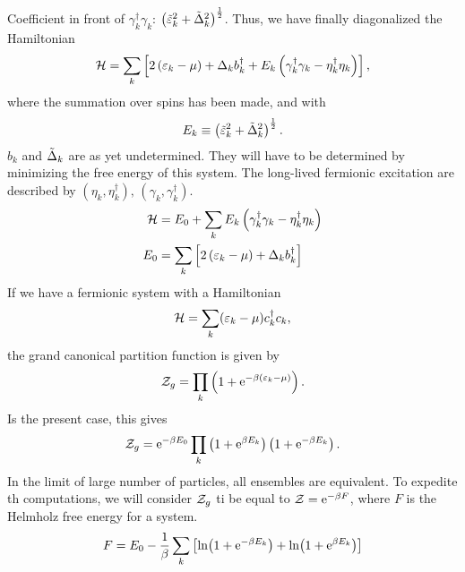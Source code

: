 Coefficient in front of $\gamma_k^\dagger\gamma_k$: $\left(\tilde{\varepsilon}_k^2 + \tilde{\Delta}_k^2\right)^\frac12$. Thus, we have finally diagonalized the Hamiltonian 
\begin{equation}
\mathcal{H} = \sum_k\left[2\left(\varepsilon_k-\mu\right) + \Delta_kb_k^\dagger + E_k\left(\gamma_k^\dagger\gamma_k - \eta_k^\dagger\eta_k\right)\right],
\end{equation}
where the summation over spins has been made, and with
\begin{equation}
E_k\equiv \left(\tilde{\varepsilon}_k^2 + \tilde{\Delta}_k^2\right)^\frac12.
\end{equation}
$b_k$ and $\tilde{\Delta}_k$ are as yet undetermined. They will have to be determined by minimizing the free energy of this system. 
The long-lived fermionic excitation are described by $(\eta_k, \eta_k^\dagger),\,(\gamma_k, \gamma_k^\dagger)$.
\begin{align}
\mathcal{H} &= E_0 + \sum_k E_k\left(\gamma_k^\dagger\gamma_k - \eta_k^\dagger\eta_k \right) \\
E_0 &= \sum_k \left[2\left(\varepsilon_k-\mu\right) + \Delta_kb_k^\dagger\right]
\end{align}
If we have a fermionic system with a Hamiltonian \[\mathcal{H} = \sum_k(\varepsilon_k-\mu)c^\dagger_kc_k,\] the grand canonical partition function is given by
\begin{equation}
\mathcal{Z}_g = \prod_k\left(1+\mathrm{e}^{-\beta(\varepsilon_k-\mu)}\right).
\end{equation}
Is the present case, this gives 
\begin{equation}
\mathcal{Z}_g =\mathrm{e}^{-\beta E_0}\prod_k\left(1+\mathrm{e}^{\beta E_k}\right)\left(1+\mathrm{e}^{-\beta E_k}\right).
\end{equation}
In the limit of large number of particles, all ensembles are equivalent. To expedite th computations, we will consider $\mathcal{Z}_g$ ti be equal to $\mathcal{Z} = \mathrm{e}^{-\beta F}$, where $F$ is the Helmholz free energy for a system.
\begin{equation}
\label{eq:BCS_free_energy}
F = E_0 -\frac1\beta\sum_k\left[\ln(1+\mathrm{e}^{-\beta E_k}) + \ln(1+\mathrm{e}^{\beta E_k})\right]
\end{equation}

